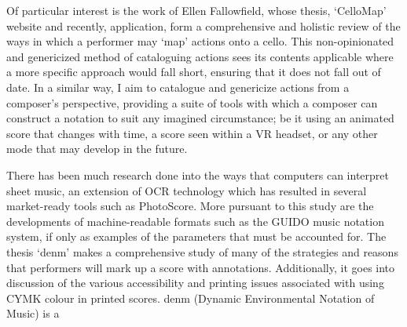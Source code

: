 Of particular interest is the work of Ellen Fallowfield, whose thesis, `CelloMap' website and recently, application, form a comprehensive and holistic review of the ways in which a performer may `map' actions onto a cello.\autocite[]{fallowfieldCelloMapHandbook2009,fallowfieldCelloMap}
This non-opinionated and genericized method of cataloguing actions sees its contents applicable where a more specific approach would fall short, ensuring that it does not fall out of date.
In a similar way, I aim to catalogue and genericize actions from a composer's perspective, providing a suite of tools with which a composer can construct a notation to suit any imagined circumstance; be it using an animated score that changes with time, a score seen within a VR headset, or any other mode that may develop in the future.

There has been much research done into the ways that computers can interpret sheet music, an extension of OCR technology which has resulted in several market-ready tools such as PhotoScore. 
More pursuant to this study are the developments of machine-readable formats such as the GUIDO music notation system, if only as examples of the parameters that must be accounted for.
The thesis `denm' makes a comprehensive study of many of the strategies and reasons that performers will mark up a score with annotations. 
Additionally, it goes into discussion of the various accessibility and printing issues associated with using CYMK colour in printed scores.\autocite[22--29]{beanDenmDynamicEnvironmental}
denm (Dynamic Environmental Notation of Music) is a 


